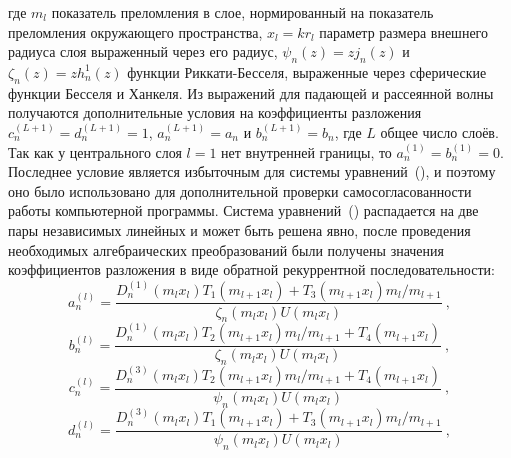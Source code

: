 где $m_l$ показатель преломления в слое, нормированный на показатель
преломления окружающего пространства, $x_l=kr_l$ параметр размера
внешнего радиуса слоя выраженный через его радиус,
$\psi_{n}(z) = z j_n(z)$ и $\zeta_{n}(z) = z h_n^1(z)$ функции
Риккати-Бесселя, выраженные через сферические функции Бесселя и
Ханкеля.  Из выражений для падающей и рассеянной волны получаются
дополнительные условия на коэффициенты разложения
$c_n^{(L+1)}=d_n^{(L+1)}=1$, $a_n^{(L+1)}=a_n$ и $b_n^{(L+1)}=b_n$,
где $L$ общее число слоёв. Так как у центрального слоя $l=1$ нет
внутренней границы, то $a_n^{(1)}=b_n^{(1)}=0$. Последнее условие
является избыточным для системы
уравнений~(), и поэтому оно
было использовано для дополнительной проверки самосогласованности
работы компьютерной программы.  Система
уравнений~() распадается на
две пары независимых линейных и может быть решена явно, после
проведения необходимых алгебраических преобразований были получены
значения коэффициентов разложения в виде обратной рекуррентной
последовательности:
\begin{equation}
\label{eq:6p1}
a^{(l)}_n = \frac
{
    {D^{(1)}_{n}}{\left (m_{l} x_{l} \right )}
    T_1\left (m_{l+1} x_{l} \right )
    +
    T_3\left (m_{l+1} x_{l} \right )
    m_{l}/m_{l+1}
}
{
   \zeta_{n}\left (m_{l} x_{l} \right )
   U\left (m_{l} x_{l} \right )
}\:,
\end{equation}
\begin{equation}
\label{eq:6p2}
b^{(l)}_n = \frac
{
    {D^{(1)}_{n}}{\left (m_{l} x_{l} \right )}
    T_2\left (m_{l+1} x_{l} \right )
    m_{l}/m_{l+1}
    +
    T_4\left (m_{l+1} x_{l} \right )
}
{
   \zeta_{n}\left (m_{l} x_{l} \right )
   U\left (m_{l} x_{l} \right )
}\:,
\end{equation}
\begin{equation}
\label{eq:6p3}
c^{(l)}_n = \frac
{
    {D^{(3)}_{n}}{\left (m_{l} x_{l} \right )}
    T_2\left (m_{l+1} x_{l} \right )
    m_{l}/m_{l+1}
    +
    T_4\left (m_{l+1} x_{l} \right )
}
{
   \psi_{n}\left (m_{l} x_{l} \right )
   U\left (m_{l} x_{l} \right )
}\:,
\end{equation}
\begin{equation}
\label{eq:6p4}
d^{(l)}_n = \frac
{
    {D^{(3)}_{n}}{\left (m_{l} x_{l} \right )}
    T_1\left (m_{l+1} x_{l} \right )
    +
    T_3\left (m_{l+1} x_{l} \right )
    m_{l}/m_{l+1}
}
{
   \psi_{n}\left (m_{l} x_{l} \right )
   U\left (m_{l} x_{l} \right )
}\:,
\end{equation}

